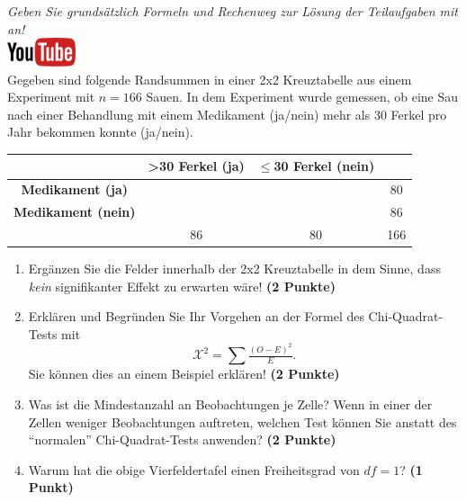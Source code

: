\documentclass[a4paper, 10pt]{scrartcl}\usepackage[]{graphicx}\usepackage[]{xcolor}
\begin{document}
\textit{Geben Sie grunds{\"a}tzlich Formeln und Rechenweg zur L{\"o}sung der
  Teilaufgaben mit an!} \\[1Ex]

\hfill\href{https://youtu.be/jakM7fHyZfU}{\includegraphics[width =
  2cm]{img/youtube}}\\[1Ex]




Gegeben sind folgende Randsummen in einer 2x2 Kreuztabelle aus einem
Experiment mit $n = 166$ Sauen. In dem Experiment wurde gemessen,
ob eine Sau nach einer Behandlung mit einem Medikament (ja/nein)
mehr als 30 Ferkel pro Jahr bekommen konnte (ja/nein).

\vspace{5Ex}

\begin{center}
  \Large
  \begin{tabular}{c|c|c|c}
     & \textbf{>30 Ferkel (ja)} & \textbf{$\leq$30 Ferkel (nein)} &  \strut\\
    \hline
    \textbf{Medikament (ja)} & \phantom{100}  & \phantom{100}  &   80  \strut\\
    \hline
    \textbf{Medikament (nein)} & \phantom{100}  & \phantom{100}  &   86   \strut\\
    \hline
     &  86 &  80 &  166  \strut\\
  \end{tabular}
\end{center}



\vspace{5Ex}

\begin{enumerate}
\item Erg{\"a}nzen Sie die Felder innerhalb der 2x2 Kreuztabelle in dem Sinne,
  dass \textit{kein} signifikanter Effekt zu erwarten w{\"a}re!
  \textbf{(2 Punkte)}
\item Erkl{\"a}ren und Begr{\"u}nden Sie Ihr Vorgehen an der Formel des
  Chi-Quadrat-Tests mit
  \begin{equation*}
  \mathcal{X}^2 = \sum\tfrac{(O - E)^2}{E}.  
  \end{equation*}
  Sie k{\"o}nnen dies an einem Beispiel erkl{\"a}ren! \textbf{(2 Punkte)}
\item Was ist die Mindestanzahl an Beobachtungen je Zelle? Wenn in einer
  der Zellen weniger Beobachtungen auftreten, welchen Test k{\"o}nnen Sie
  anstatt des "`normalen"' Chi-Quadrat-Tests anwenden? \textbf{(2 Punkte)}
\item Warum hat die obige Vierfeldertafel einen Freiheitsgrad von $df=1$?
  \textbf{(1 Punkt)}
\end{enumerate} 
\clearpage
\end{document}
